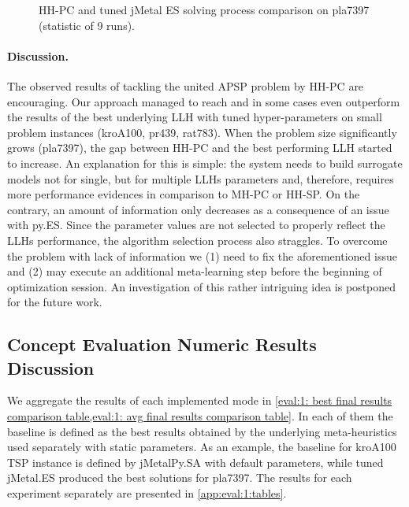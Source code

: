 \begin{figure}[h]
	\centering
	\vspace{-5pt}
	
	\caption{HH-PC and tuned jMetal ES solving process comparison on pla7397 (statistic of 9 runs).}
	\vspace{-5pt}
	\label{eval:pict:hh-pc vs jES on pla7397 process}
\end{figure}

\paragraph{Discussion.} The observed results of tackling the united APSP problem by HH-PC are encouraging. Our approach managed to reach and in some cases even outperform the results of the best underlying LLH with tuned hyper-parameters on small problem instances (kroA100, pr439, rat783). When the problem size significantly grows (pla7397), the gap between HH-PC and the best performing LLH started to increase. An explanation for this is simple: the system needs to build surrogate models not for single, but for multiple LLHs parameters and, therefore, requires more performance evidences in comparison to MH-PC or HH-SP. On the contrary, an amount of information only decreases as a consequence of an issue with py.ES. Since the parameter values are not selected to properly reflect the LLHs performance, the algorithm selection process also straggles. To overcome the problem with lack of information we (1) need to fix the aforementioned issue and (2) may execute an additional meta-learning step before the beginning of optimization session. An investigation of this rather intriguing idea is postponed for the future work.


\subsection{Concept Evaluation Numeric Results Discussion}
We aggregate the results of each implemented mode in \cref{eval:1: best final results comparison table,eval:1: avg final results comparison table}. In each of them the baseline is defined as the best results obtained by the underlying meta-heuristics used separately with static parameters. As an example, the baseline for kroA100 TSP instance is defined by jMetalPy.SA with default parameters, while tuned jMetal.ES produced the best solutions for pla7397. The results for each experiment separately are presented in \cref{app:eval:1:tables}.

